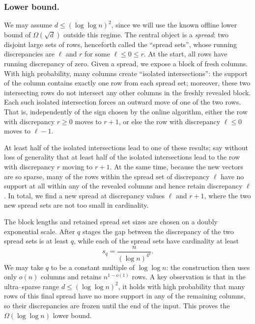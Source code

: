 \documentclass[reqno,english]{amsart}
\theoremstyle{definition}
\begin{document}
\subsubsection{Lower bound.} We may assume $d \le (\log \log n)^2$, since we will use the known offline lower bound of $\Omega(\sqrt{d})$ outside this regime. The central object is a \emph{spread}: two disjoint large
sets of rows, henceforth called the ``spread sets'', whose running discrepancies are $\ell$ and $r$ for some $\ell\le0\le r$.  At
the start, all rows have running discrepancy of zero. Given a spread, we expose a block of
fresh columns. With high probability, many columns create ``isolated intersections'': the support of the column contains exactly one row from each spread set; moreover, these two intersecting rows do not intersect any other columns in the freshly revealed block. Each such isolated intersection forces an outward move of one of the two rows. That is, independently of the sign chosen by the online algorithm, either the row with discrepancy $r \ge 0$ moves to $r+1$, or else the row with discrepancy $\ell \le 0$ moves to $\ell-1$.

At least half of the isolated intersections lead to one of these results; say without loss of generality that at least half of the isolated intersections lead to the row with discrepancy $r$ moving to $r+1$. At the same time, because the new vectors are so sparse, many of the rows within the spread set of discrepancy $\ell$ have no support at all within any of the revealed columns and hence retain discrepancy $\ell$. In total, we find a new spread at discrepancy values $\ell$ and $r+1$, where the two new spread sets are not too small in cardinality.

The block lengths and retained spread set sizes are chosen on a doubly exponential
scale.  After $q$ stages the gap between the discrepancy of the two spread sets is at least $q$, while each of the spread sets have cardinality at least
\[
    s_q=\frac{n}{(\log n)^{4^q}}.
\]
We may take $q$ to be a constant multiple of
$\log\log n$: the construction then uses only $o(n)$ columns and retains
$n^{1-o(1)}$ rows. A key observation is that in the ultra--sparse range
$d\le(\log\log n)^2$, it holds with high probability that many rows of this final spread have no more support in any of the remaining columns, so their discrepancies are frozen
until the end of the input. This proves the $\Omega(\log\log n)$ lower bound.
\end{document}
